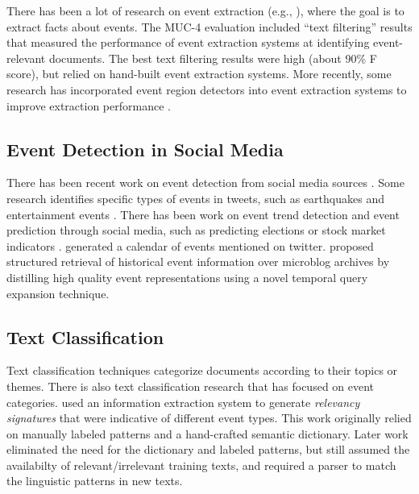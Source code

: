 There has been a lot of research on event
extraction (e.g.,
\cite{ace,hobbs93,riloff-aaai96,yangarber00,chieu02,califf03,sudo03,stevenson05,sekine06}),
where the goal is to extract facts about events. 
The MUC-4 evaluation \cite{muc4-proceedings} included ``text filtering''
results that measured the performance of event extraction systems at
identifying event-relevant documents. The best text filtering
results were high (about 90\% F score), but relied on hand-built
event extraction systems.
More recently, some research has incorporated event
region detectors into event extraction systems to improve extraction
performance \cite{gu06,patwardhan-emnlp07}.

\subsection{Event Detection in Social Media}

There has been recent work on event detection from social media
sources \cite{Becker11,Popescu11}.  Some research identifies
specific types of events in tweets, such as earthquakes
\cite{Sakaki10} and entertainment events \cite{Benson11}.  There has
been work on event trend detection \cite{Lampos10,Mathioudakis10}
and event prediction through social media, such as predicting 
elections \cite{Tumasjan10,Conover11} or stock market indicators 
\cite{Zhang10}.  \cite{Ritter12} generated a calendar of events 
mentioned on twitter. \cite{Metzler12} proposed structured
retrieval of historical event information over 
microblog archives 
by distilling 
high quality event representations using 
a novel temporal query expansion technique.

\subsection{Text Classification}
Text classification techniques \cite{Nigam00,Forman03,Joachims99} categorize documents according 
to their topics or themes. 
There is also text classification research that has focused on event categories.
\cite{acmtois94} used an information extraction system to generate
{\it relevancy signatures} that were indicative of different event types.
This work originally relied on manually labeled patterns and a
hand-crafted semantic dictionary. Later work \cite{riloff-nlir99} eliminated the
need for the dictionary and labeled patterns, but still assumed
the availabilty of relevant/irrelevant training texts, and
required a parser to match the linguistic patterns in new texts. 



